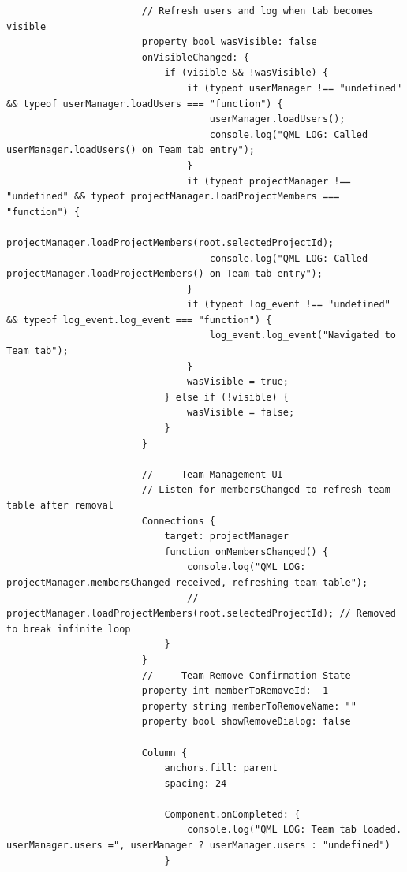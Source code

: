 \documentclass{report}
\begin{document}
\begin{lstlisting}
                        // Refresh users and log when tab becomes visible
                        property bool wasVisible: false
                        onVisibleChanged: {
                            if (visible && !wasVisible) {
                                if (typeof userManager !== "undefined" && typeof userManager.loadUsers === "function") {
                                    userManager.loadUsers();
                                    console.log("QML LOG: Called userManager.loadUsers() on Team tab entry");
                                }
                                if (typeof projectManager !== "undefined" && typeof projectManager.loadProjectMembers === "function") {
                                    projectManager.loadProjectMembers(root.selectedProjectId);
                                    console.log("QML LOG: Called projectManager.loadProjectMembers() on Team tab entry");
                                }
                                if (typeof log_event !== "undefined" && typeof log_event.log_event === "function") {
                                    log_event.log_event("Navigated to Team tab");
                                }
                                wasVisible = true;
                            } else if (!visible) {
                                wasVisible = false;
                            }
                        }

                        // --- Team Management UI ---
                        // Listen for membersChanged to refresh team table after removal
                        Connections {
                            target: projectManager
                            function onMembersChanged() {
                                console.log("QML LOG: projectManager.membersChanged received, refreshing team table");
                                // projectManager.loadProjectMembers(root.selectedProjectId); // Removed to break infinite loop
                            }
                        }
                        // --- Team Remove Confirmation State ---
                        property int memberToRemoveId: -1
                        property string memberToRemoveName: ""
                        property bool showRemoveDialog: false

                        Column {
                            anchors.fill: parent
                            spacing: 24

                            Component.onCompleted: {
                                console.log("QML LOG: Team tab loaded. userManager.users =", userManager ? userManager.users : "undefined")
                            }


\end{lstlisting}
\end{document}

